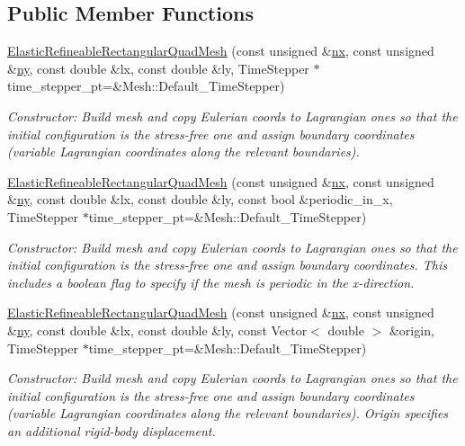 \subsection*{Public Member Functions}
\begin{DoxyCompactItemize}
\item 
\hyperlink{classoomph_1_1ElasticRefineableRectangularQuadMesh_aa3d9df728974ce172bf942bc4f6c1a2d}{Elastic\+Refineable\+Rectangular\+Quad\+Mesh} (const unsigned \&\hyperlink{classoomph_1_1RectangularQuadMesh_abfef93d6322886cdce14a437186e4821}{nx}, const unsigned \&\hyperlink{classoomph_1_1RectangularQuadMesh_a86d76a55eb7c4e8bca9b74d23c8b0412}{ny}, const double \&lx, const double \&ly, Time\+Stepper $\ast$time\+\_\+stepper\+\_\+pt=\&Mesh\+::\+Default\+\_\+\+Time\+Stepper)
\begin{DoxyCompactList}\small\item\em Constructor\+: Build mesh and copy Eulerian coords to Lagrangian ones so that the initial configuration is the stress-\/free one and assign boundary coordinates (variable Lagrangian coordinates along the relevant boundaries). \end{DoxyCompactList}\item 
\hyperlink{classoomph_1_1ElasticRefineableRectangularQuadMesh_a8925d6c0eb669afc420564a4610b34bd}{Elastic\+Refineable\+Rectangular\+Quad\+Mesh} (const unsigned \&\hyperlink{classoomph_1_1RectangularQuadMesh_abfef93d6322886cdce14a437186e4821}{nx}, const unsigned \&\hyperlink{classoomph_1_1RectangularQuadMesh_a86d76a55eb7c4e8bca9b74d23c8b0412}{ny}, const double \&lx, const double \&ly, const bool \&periodic\+\_\+in\+\_\+x, Time\+Stepper $\ast$time\+\_\+stepper\+\_\+pt=\&Mesh\+::\+Default\+\_\+\+Time\+Stepper)
\begin{DoxyCompactList}\small\item\em Constructor\+: Build mesh and copy Eulerian coords to Lagrangian ones so that the initial configuration is the stress-\/free one and assign boundary coordinates. This includes a boolean flag to specify if the mesh is periodic in the x-\/direction. \end{DoxyCompactList}\item 
\hyperlink{classoomph_1_1ElasticRefineableRectangularQuadMesh_a1cea0e91f2d8687182a8f5de6737a511}{Elastic\+Refineable\+Rectangular\+Quad\+Mesh} (const unsigned \&\hyperlink{classoomph_1_1RectangularQuadMesh_abfef93d6322886cdce14a437186e4821}{nx}, const unsigned \&\hyperlink{classoomph_1_1RectangularQuadMesh_a86d76a55eb7c4e8bca9b74d23c8b0412}{ny}, const double \&lx, const double \&ly, const Vector$<$ double $>$ \&origin, Time\+Stepper $\ast$time\+\_\+stepper\+\_\+pt=\&Mesh\+::\+Default\+\_\+\+Time\+Stepper)
\begin{DoxyCompactList}\small\item\em Constructor\+: Build mesh and copy Eulerian coords to Lagrangian ones so that the initial configuration is the stress-\/free one and assign boundary coordinates (variable Lagrangian coordinates along the relevant boundaries). Origin specifies an additional rigid-\/body displacement. \end{DoxyCompactList}\end{DoxyCompactItemize}
